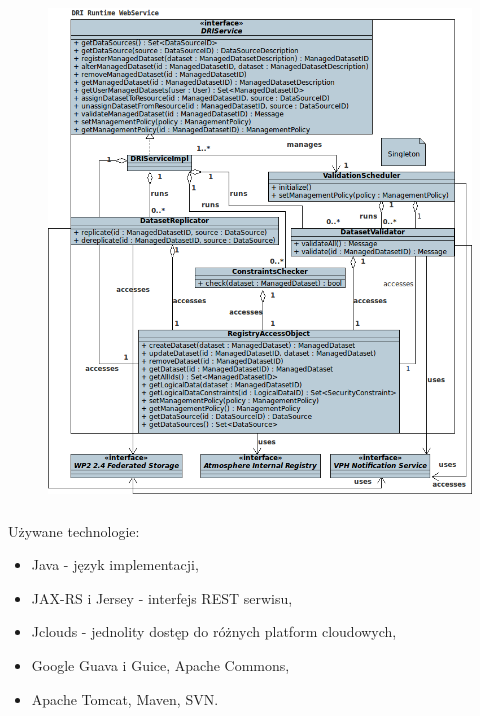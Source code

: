 \documentclass{beamer}
\begin{document}
\begin{frame}
\begin{figure}
\includegraphics[width=0.85\textheight]{dri-service.png}
\end{figure}
\end{frame}

\begin{frame}
\frametitle{}
\begin{block}{Używane technologie:}
\begin{itemize}
	\item Java - język implementacji,
	\item JAX-RS i Jersey - interfejs REST serwisu,
	\item Jclouds - jednolity dostęp do różnych platform cloudowych,
	\item Google Guava i Guice, Apache Commons,
	\item Apache Tomcat, Maven, SVN.
\end{itemize}
\end{block}
\end{frame}
\end{document}
